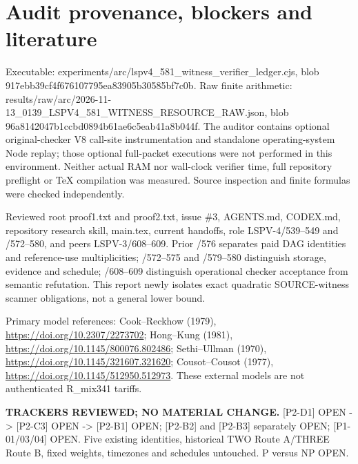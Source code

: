 \documentclass[11pt]{article}
\begin{document}
\section*{Audit provenance, blockers and literature}
Executable: experiments/arc/lspv4_581_witness_verifier_ledger.cjs, blob 917ebb39cf4f676107795ea83905b30585bf7c0b. Raw finite arithmetic: results/raw/arc/2026-11-13_0139_LSPV4_581_WITNESS_RESOURCE_RAW.json, blob 96a8142047b1ccbd0894b61ae6c5eab41a8b044f. The auditor contains optional original-checker V8 call-site instrumentation and standalone operating-system Node replay; those optional full-packet executions were not performed in this environment. Neither actual RAM nor wall-clock verifier time, full repository preflight or TeX compilation was measured. Source inspection and finite formulas were checked independently.

Reviewed root proof1.txt and proof2.txt, issue \#3, AGENTS.md, CODEX.md, repository research skill, main.tex, current handoffs, role LSPV-4/539--549 and /572--580, and peers LSPV-3/608--609. Prior /576 separates paid DAG identities and reference-use multiplicities; /572--575 and /579--580 distinguish storage, evidence and schedule; /608--609 distinguish operational checker acceptance from semantic refutation. This report newly isolates exact quadratic SOURCE-witness scanner obligations, not a general lower bound.

Primary model references: Cook--Reckhow (1979), \url{https://doi.org/10.2307/2273702}; Hong--Kung (1981), \url{https://doi.org/10.1145/800076.802486}; Sethi--Ullman (1970), \url{https://doi.org/10.1145/321607.321620}; Cousot--Cousot (1977), \url{https://doi.org/10.1145/512950.512973}. These external models are not authenticated R_mix341 tariffs.

\textbf{TRACKERS REVIEWED; NO MATERIAL CHANGE.} [P2-D1] OPEN -> [P2-C3] OPEN -> [P2-B1] OPEN; [P2-B2] and [P2-B3] separately OPEN; [P1-01/03/04] OPEN. Five existing identities, historical TWO Route A/THREE Route B, fixed weights, timezones and schedules untouched. P versus NP OPEN.
\end{document}
